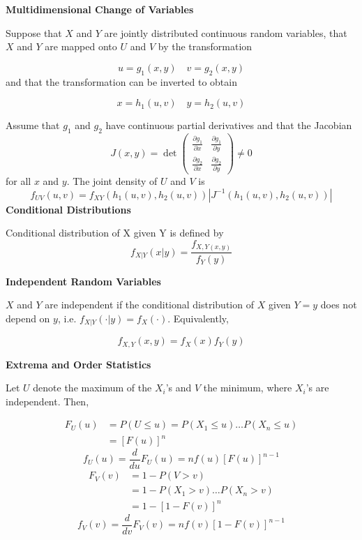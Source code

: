 \documentclass[a4paper]{article}
\newcommand{\subheading}[1]{{\scriptsize\textbf{#1}}}
\begin{document}
\begin{multicols*}{4}
\smallskip

\subheading{Multidimensional Change of Variables}

Suppose that $X$ and $Y$ are jointly distributed continuous random variables, that $X$ and $Y$ are mapped onto $U$ and $V$ by the transformation

$$
u=g_1(x, y) \quad v=g_2(x, y)
$$
and that the transformation can be inverted to obtain

$$
x=h_1(u, v) \quad y=h_2(u, v)
$$

Assume that $g_1$ and $g_2$ have continuous partial derivatives and that the Jacobian
$$
J(x, y)=\operatorname{det}\left(\begin{array}{ll}
\frac{\partial g_1}{\partial x} & \frac{\partial g_1}{\partial y} \\
\frac{\partial g_2}{\partial x} & \frac{\partial g_2}{\partial y}
\end{array}\right) \neq 0
$$
for all $x$ and $y$.
The joint density of $U$ and $V$ is
$$
f_{U V}(u, v)=f_{X Y}\left(h_1(u, v), h_2(u, v)\right)\left|J^{-1}\left(h_1(u, v), h_2(u, v)\right)\right|
$$
\smallskip
\subheading{Conditional Distributions}

Conditional distribution of X given Y is defined by
$$
f_{X|Y}(x|y) = \frac{f_{X,Y(x,y)}}{f_Y(y)}
$$

\subheading{Independent Random Variables}

$X$ and $Y$ are independent if the conditional distribution of $X$ given $Y=y$ does not depend on $y$, i.e. $f_{X|Y}(\cdot|y) = f_X(\cdot)$. Equivalently,

$$
f_{X,Y}(x,y)=f_X(x)f_Y(y) 
$$

\subheading{Extrema and Order Statistics}

Let $U$ denote the maximum of the $X_i$'s and $V$ the minimum, where $X_i$'s are independent. Then,

$$
\begin{aligned}
F_U(u)&=P(U \leq u)=P\left(X_1 \leq u\right) \ldots P\left(X_n \leq u\right)\\ 
&=[F(u)]^n
\end{aligned}
$$
$$
f_U(u)=\frac{d}{d u} F_U(u)=n f(u)[F(u)]^{n-1}
$$
$$
\begin{aligned}
F_V(v)&=1-P(V>v) \\&=1-P\left(X_1>v\right) \ldots P\left(X_n>v\right)\\
&=1-[1-F(v)]^n
\end{aligned}
$$
$$
f_V(v)=\frac{d}{d v} F_V(v)=n f(v)[1-F(v)]^{n-1}
$$



\end{multicols*}
\end{document}
